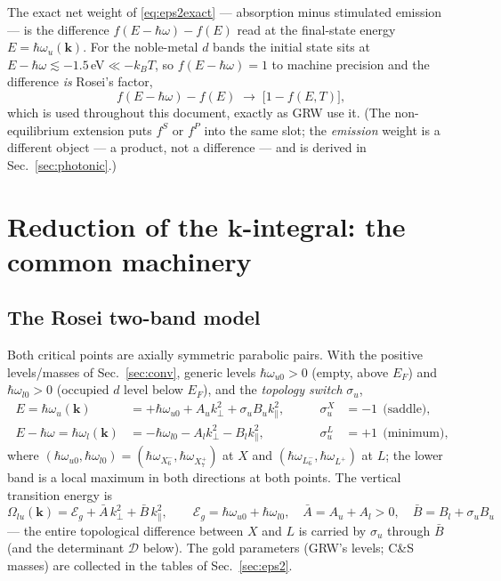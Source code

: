 \documentclass[11pt,a4paper]{article}
\numberwithin{equation}{section}
\newcommand{\hw}{\hbar\omega}
\newcommand{\Eg}{\mathcal{E}_g}
\newcommand{\cD}{\mathcal{D}}
\newcommand{\Ab}{\bar{A}}
\newcommand{\Bb}{\bar{B}}
\newcommand{\kperp}{k_{\perp}}
\newcommand{\kpar}{k_{\parallel}}
\newcommand{\wXu}{\hbar\omega_{X_6^-}}
\newcommand{\wXl}{\hbar\omega_{X_7^+}}
\newcommand{\wLu}{\hbar\omega_{L_6^-}}
\newcommand{\wLl}{\hbar\omega_{L^+}}
\newcommand{\wuz}{\hbar\omega_{u0}}
\newcommand{\wlz}{\hbar\omega_{l0}}
\newcommand{\fFD}{f}
\newcommand{\kB}{k_B}
\begin{document}
The exact net weight of \eqref{eq:eps2exact} --- absorption minus
stimulated emission --- is the difference
$\fFD(E-\hw)-\fFD(E)$ read at the final-state energy
$E=\hbar\omega_u(\mathbf k)$.  For the noble-metal $d$ bands the
initial state sits at $E-\hw\lesssim-1.5\,$eV${}\ll-\kB T$, so
$\fFD(E-\hw)=1$ to machine precision and the difference \emph{is}
Rosei's factor,
\begin{equation}
\fFD(E-\hw)-\fFD(E)\;\longrightarrow\;\bigl[1-\fFD(E,T)\bigr],
\label{eq:occup}
\end{equation}
which is used throughout this document, exactly as GRW use it.  (The
non-equilibrium extension puts $f^S$ or $f^P$ into the same slot; the
\emph{emission} weight is a different object --- a product, not a
difference --- and is derived in Sec.~\ref{sec:photonic}.)

\section{Reduction of the $\mathbf{k}$-integral: the common machinery}
\label{sec:reduction}

\subsection{The Rosei two-band model}\label{sec:bands}

Both critical points are axially symmetric parabolic pairs.  With the
positive levels/masses of Sec.~\ref{sec:conv}, generic levels
$\wuz>0$ (empty, above $E_F$) and $\wlz>0$ (occupied $d$ level below
$E_F$), and the \emph{topology switch} $\sigma_u$,
\begin{equation}
\boxed{\;
\begin{aligned}
E=\hbar\omega_u(\mathbf k)&=+\wuz+A_u\kperp^{2}+\sigma_u B_u\kpar^{2},
&\qquad \sigma_u^{X}&=-1\ \ \text{(saddle)},\\[2pt]
E-\hw=\hbar\omega_l(\mathbf k)&=-\wlz-A_l\kperp^{2}-B_l\kpar^{2},
&\qquad \sigma_u^{L}&=+1\ \ \text{(minimum)},
\end{aligned}\;}
\label{eq:bands}
\end{equation}
where $(\wuz,\wlz)=(\wXu,\wXl)$ at $X$ and $(\wLu,\wLl)$ at $L$; the
lower band is a local maximum in both directions at both points.  The
vertical transition energy is
\begin{equation}
\Omega_{lu}(\mathbf k)
=\Eg+\Ab\,\kperp^{2}+\Bb\,\kpar^{2},
\qquad
\Eg=\wuz+\wlz,\quad
\Ab=A_u+A_l>0,\quad
\boxed{\Bb=B_l+\sigma_uB_u}
\label{eq:Omega}
\end{equation}
--- the entire topological difference between $X$ and $L$ is carried
by $\sigma_u$ through $\Bb$ (and the determinant $\cD$ below).  The
gold parameters (GRW's levels; C\&S masses) are collected in the
tables of Sec.~\ref{sec:eps2}.
\end{document}
